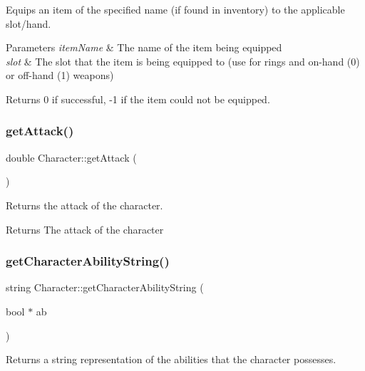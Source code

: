 Equips an item of the specified name (if found in inventory) to the applicable slot/hand. 


\begin{DoxyParams}{Parameters}
{\em item\+Name} & The name of the item being equipped \\
\hline
{\em slot} & The slot that the item is being equipped to (use for rings and on-\/hand (0) or off-\/hand (1) weapons) \\
\hline
\end{DoxyParams}
\begin{DoxyReturn}{Returns}
0 if successful, -\/1 if the item could not be equipped. 
\end{DoxyReturn}
\mbox{\label{class_character_a10103c3d082351807a06dc758b49ca4e}} 
\subsubsection{\texorpdfstring{getAttack()}{getAttack()}}
{\footnotesize\ttfamily double Character\+::get\+Attack (\begin{DoxyParamCaption}{ }\end{DoxyParamCaption})}



Returns the attack of the character. 

\begin{DoxyReturn}{Returns}
The attack of the character 
\end{DoxyReturn}
\mbox{\label{class_character_ad1e769bb07c97c93de648fca312caef0}} 
\subsubsection{\texorpdfstring{getCharacterAbilityString()}{getCharacterAbilityString()}}
{\footnotesize\ttfamily string Character\+::get\+Character\+Ability\+String (\begin{DoxyParamCaption}\item[{bool $\ast$}]{ab }\end{DoxyParamCaption})}



Returns a string representation of the abilities that the character possesses. 


